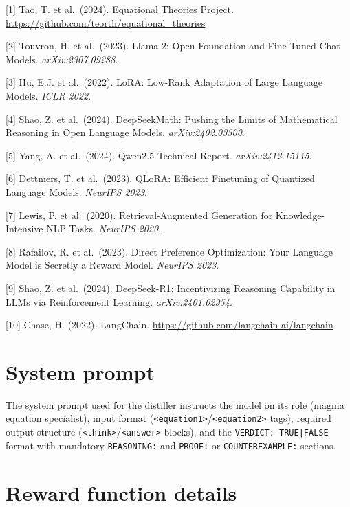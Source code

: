 \documentclass{article}
\begin{document}
{\small

[1] Tao, T. et al.\ (2024). Equational Theories Project. \url{https://github.com/teorth/equational_theories}

[2] Touvron, H. et al.\ (2023). Llama 2: Open Foundation and Fine-Tuned Chat Models. \textit{arXiv:2307.09288}.

[3] Hu, E.J. et al.\ (2022). LoRA: Low-Rank Adaptation of Large Language Models. \textit{ICLR 2022}.

[4] Shao, Z. et al.\ (2024). DeepSeekMath: Pushing the Limits of Mathematical Reasoning in Open Language Models. \textit{arXiv:2402.03300}.

[5] Yang, A. et al.\ (2024). Qwen2.5 Technical Report. \textit{arXiv:2412.15115}.

[6] Dettmers, T. et al.\ (2023). QLoRA: Efficient Finetuning of Quantized Language Models. \textit{NeurIPS 2023}.

[7] Lewis, P. et al.\ (2020). Retrieval-Augmented Generation for Knowledge-Intensive NLP Tasks. \textit{NeurIPS 2020}.

[8] Rafailov, R. et al.\ (2023). Direct Preference Optimization: Your Language Model is Secretly a Reward Model. \textit{NeurIPS 2023}.

[9] Shao, Z. et al.\ (2024). DeepSeek-R1: Incentivizing Reasoning Capability in LLMs via Reinforcement Learning. \textit{arXiv:2401.02954}.

[10] Chase, H. (2022). LangChain. \url{https://github.com/langchain-ai/langchain}

}


\appendix

\section{System prompt}
\label{app:prompt}

The system prompt used for the distiller instructs the model on its role (magma equation specialist), input format (\texttt{<equation1>}/\texttt{<equation2>} tags), required output structure (\texttt{<think>}/\texttt{<answer>} blocks), and the \texttt{VERDICT:~TRUE|FALSE} format with mandatory \texttt{REASONING:} and \texttt{PROOF:} or \texttt{COUNTEREXAMPLE:} sections.

\section{Reward function details}
\label{app:reward}
\end{document}
